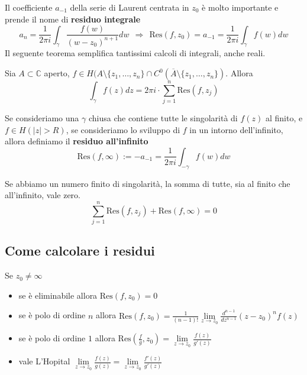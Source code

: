 Il coefficiente $a_{-1}$ della serie di Laurent centrata in $z_{0}$ è molto importante e prende il nome di \textbf{residuo integrale}
\begin{equation*}
a_{n} =\frac{1}{2\pi i}\int _{\gamma }\frac{f( w)}{( w-z_{0})^{n+1}} dw\ \ \Rightarrow \ \ \mathrm{Res}( f,z_{0}) =a_{-1} =\frac{1}{2\pi i}\int _{\gamma } f( w) dw
\end{equation*}
Il seguente teorema semplifica tantissimi calcoli di integrali, anche reali.
\begin{thm}
 Sia $A\subset \mathbb{C}$ aperto, $f\in H( A\setminus \{z_{1} ,\dotsc ,z_{n}\} \cap C^{0}(\overline{A} \setminus \{z_{1} ,\dotsc ,z_{n}\})$. Allora
\begin{equation*}
\boxed{\int _{\gamma } f( z) dz=2\pi i\cdotp \sum\limits ^{n}_{j=1}\mathrm{Res}( f,z_{j})}
\end{equation*}
\end{thm}
\begin{defn}
Se consideriamo una $\gamma $ chiusa che contiene tutte le singolarità di $f( z)$ al finito, e $f\in H(| z|  >R)$, se consideriamo lo sviluppo di $f$ in un intorno dell'infinito, allora definiamo il \textbf{residuo all'infinito}
\begin{equation*}
\mathrm{Res}( f,\infty ) :=-a_{-1} =\frac{1}{2\pi i}\int _{-\gamma } f( w) dw
\end{equation*}
\end{defn}
\begin{thm}
Se abbiamo un numero finito di singolarità, la somma di tutte, sia al finito che all'infinito, vale zero.
\begin{equation*}
\sum\limits ^{n}_{j=1}\mathrm{Res}( f,z_{j}) +\mathrm{Res}( f,\infty ) =0
\end{equation*}
\end{thm}
\subsection{Come calcolare i residui}

Se $z_{0} \neq \infty $
\begin{itemize}
\item se è eliminabile allora $\mathrm{Res}( f,z_{0}) =0$
\item se è polo di ordine $n$ allora $\mathrm{Res}( f,z_{0}) = \frac{1}{(n-1)!}\lim\limits _{z\rightarrow z_{0}}\frac{d^{n-1}}{dz^{n-1}}(z-z_0)^n f(z)$
\item se è polo di ordine $1$ allora $\mathrm{Res}\left(\frac{f}{g} ,z_{0}\right) =\lim\limits _{z\rightarrow z_{0}}\frac{f( z)}{g'( z)}$
\item vale L'Hopital $\lim\limits _{z\rightarrow z_{0}}\frac{f(z)}{g(z)} =\lim\limits _{z\rightarrow z_{0}}\frac{f'(z)}{g'(z)}$
\end{itemize}

